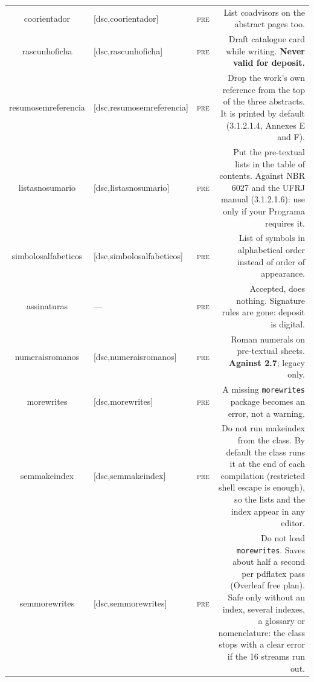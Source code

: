 \documentclass[a4paper,10pt]{article}
\newcommand\pre{\textsc{pre}}
\begin{document}
\begin{longtable}{@{}CEWD@{}}
coorientador & [dsc,coorientador] & \pre & List coadvisors on the abstract pages too. \\
rascunhoficha & [dsc,rascunhoficha] & \pre & Draft catalogue card while writing. \textbf{Never valid for deposit.} \\
resumosemreferencia & [dsc,resumosemreferencia] & \pre & Drop the work's own reference from the top of the three abstracts. It is printed by default (3.1.2.1.4, Annexes E and F). \\
listasnosumario & [dsc,listasnosumario] & \pre & Put the pre-textual lists in the table of contents. Against NBR 6027 and the UFRJ manual (3.1.2.1.6): use only if your Programa requires it. \\
simbolosalfabeticos & [dsc,simbolosalfabeticos] & \pre & List of symbols in alphabetical order instead of order of appearance. \\
assinaturas & ---           & \pre & Accepted, does nothing. Signature rules are gone: deposit is digital. \\
numeraisromanos & [dsc,numeraisromanos] & \pre & Roman numerals on pre-textual sheets. \textbf{Against 2.7}; legacy only. \\
morewrites & [dsc,morewrites] & \pre & A missing \texttt{morewrites} package becomes an error, not a warning. \\
semmakeindex & [dsc,semmakeindex] & \pre & Do not run makeindex from the class. By default the class runs it at the end of each compilation (restricted shell escape is enough), so the lists and the index appear in any editor. \\
semmorewrites & [dsc,semmorewrites] & \pre & Do not load \texttt{morewrites}. Saves about half a second per pdflatex pass (Overleaf free plan). Safe only without an index, several indexes, a glossary or nomenclature: the class stops with a clear error if the 16 streams run out. \\
\midrule


\end{longtable}
\end{document}
